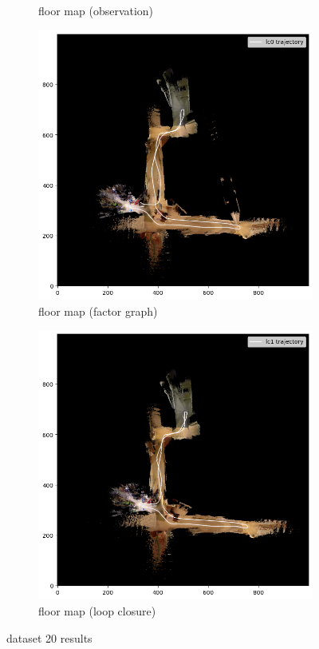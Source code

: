 \documentclass[conference]{IEEEtran}
\begin{document}
\begin{figure}[htbp]
\begin{subfigure}{0.24\textwidth}
        \caption{floor map (observation)}
        \label{fig:fmap_20_icp}
    \end{subfigure}
    \hfill
    \begin{subfigure}{0.24\textwidth}
        \includegraphics[width=\linewidth]{../img/fmap_20_lc0.png}
        \caption{floor map (factor graph)}
        \label{fig:fmap_20_lc0}
    \end{subfigure}
    \hfill
    \begin{subfigure}{0.24\textwidth}
        \includegraphics[width=\linewidth]{../img/fmap_20_lc1.png}
        \caption{floor map (loop closure)}
        \label{fig:fmap_20_lc1}
    \end{subfigure}
    
    \caption{dataset 20 results}
    \label{fig:dataset20}
\end{figure}
\end{document}
